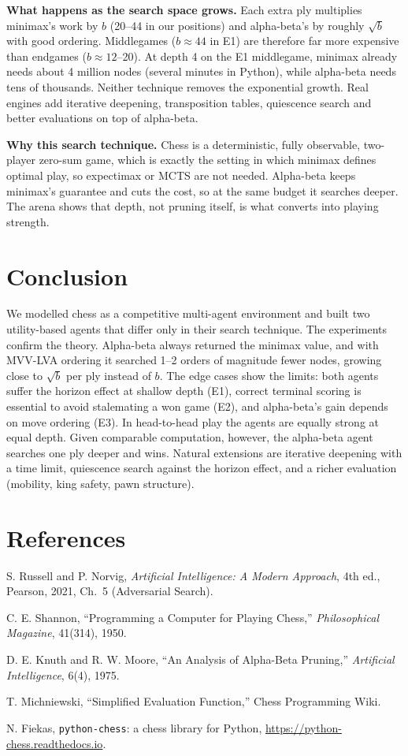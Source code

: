 \documentclass[11pt,a4paper]{article}
\begin{document}
\textbf{What happens as the search space grows.} Each extra ply multiplies minimax's work by $b$
(20--44 in our positions) and alpha-beta's by roughly $\sqrt b$ with good ordering. Middlegames ($b\approx44$ in
E1) are therefore far more expensive than endgames ($b\approx12$--20). At depth 4 on the E1 middlegame, minimax already
needs about 4 million nodes (several minutes in Python), while alpha-beta needs tens of thousands. Neither technique
removes the exponential growth. Real engines add iterative deepening, transposition tables, quiescence search and
better evaluations on top of alpha-beta.

\textbf{Why this search technique.} Chess is a deterministic, fully observable, two-player zero-sum game,
which is exactly the setting in which minimax defines optimal play, so expectimax or MCTS are not needed.
Alpha-beta keeps minimax's guarantee and cuts the cost, so at the same budget it searches deeper. The
arena shows that depth, not pruning itself, is what converts into playing strength.

\section{Conclusion}
We modelled chess as a competitive multi-agent environment and built two utility-based agents that differ only in
their search technique. The experiments confirm the theory. Alpha-beta always returned the minimax value, and with
MVV-LVA ordering it searched 1--2 orders of magnitude fewer nodes, growing close to $\sqrt b$ per ply
instead of $b$. The edge cases show the limits: both agents suffer the horizon effect at shallow depth
(E1), correct terminal scoring is essential to avoid stalemating a won game (E2), and alpha-beta's gain
depends on move ordering (E3). In head-to-head play the agents are equally strong at equal depth. Given
comparable computation, however, the alpha-beta agent searches one ply deeper and wins. Natural extensions are
iterative deepening with a time limit, quiescence search against the horizon effect, and a richer evaluation
(mobility, king safety, pawn structure).

\section*{References}
\begin{enumerate}[label={[\arabic*]}]
\item S. Russell and P. Norvig, \emph{Artificial Intelligence: A Modern Approach}, 4th ed., Pearson, 2021, Ch.~5 (Adversarial Search).
\item C. E. Shannon, ``Programming a Computer for Playing Chess,'' \emph{Philosophical Magazine}, 41(314), 1950.
\item D. E. Knuth and R. W. Moore, ``An Analysis of Alpha-Beta Pruning,'' \emph{Artificial Intelligence}, 6(4), 1975.
\item T. Michniewski, ``Simplified Evaluation Function,'' Chess Programming Wiki.
\item N. Fiekas, \texttt{python-chess}: a chess library for Python, \url{https://python-chess.readthedocs.io}.
\end{enumerate}
\end{document}
